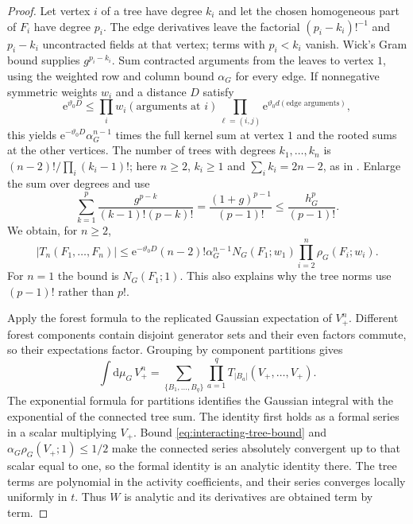 \documentclass[11pt,letterpaper,reqno]{amsart}
\newcommand{\dd}{\mathrm d}
\begin{document}
\begin{proof}
Let vertex $i$ of a tree have degree $k_i$
and let the chosen homogeneous part of $F_i$
have degree $p_i$. The edge derivatives leave
the factorial $(p_i-k_i)!^{-1}$ and $p_i-k_i$
uncontracted fields at that vertex; terms with
$p_i<k_i$ vanish. Wick's Gram bound supplies
$g^{p_i-k_i}$. Sum contracted arguments from
the leaves to vertex $1$, using the weighted
row and column bound $\alpha_G$ for every
edge. If nonnegative symmetric weights $w_i$
and a distance $D$ satisfy
\[
 \mathrm e^{\vartheta_0D}\le
       \prod_iw_i(\text{arguments at }i)
       \prod_{\ell=(i,j)}
          \mathrm e^{\vartheta_0d(\text{edge arguments})},
\]
this yields $\mathrm e^{-\vartheta_0D}\alpha_G^{n-1}$
times the full kernel sum at vertex $1$
and the rooted sums at the other vertices.
The number of trees with degrees $k_1,\ldots,k_n$
is $(n-2)!/\prod_i(k_i-1)!$; here $n\ge2$,
$k_i\ge1$ and $\sum_i k_i=2n-2$, as in
\cite[Proposition~4]{PostnikovLin2019}.
Enlarge the sum over degrees and use
\[
 \sum_{k=1}^{p}
       \frac{g^{p-k}}{(k-1)!(p-k)!}
       =\frac{(1+g)^{p-1}}{(p-1)!}
       \le\frac{h_G^p}{(p-1)!}.
\]
We obtain, for $n\ge2$,
\begin{equation}\label{eq:interacting-tree-bound}
 |T_n(F_1,\ldots,F_n)|
 \le \mathrm e^{-\vartheta_0D}(n-2)!\alpha_G^{n-1}
                N_G(F_1;w_1)\prod_{i=2}^n\rho_G(F_i;w_i).
\end{equation}
For $n=1$ the bound is $N_G(F_1;1)$.
This also explains why the tree norms use
$(p-1)!$ rather than $p!$.

Apply the forest formula to the replicated
Gaussian expectation of $V_+^n$.
Different forest components contain disjoint
generator sets and their even factors commute,
so their expectations factor. Grouping by
component partitions gives
\[
 \int\dd\mu_G\,V_+^n
       =\sum_{\{B_1,\ldots,B_q\}}
                     \prod_{a=1}^qT_{|B_a|}(V_+,\ldots,V_+).
\]
The exponential formula for partitions
identifies the Gaussian integral with the
exponential of the connected tree sum.
The identity first holds as a formal series
in a scalar multiplying $V_+$. Bound
\eqref{eq:interacting-tree-bound} and
$\alpha_G\rho_G(V_+;1)\le1/2$ make the
connected series absolutely convergent up
to that scalar equal to one, so the formal
identity is an analytic identity there.
The tree terms are polynomial in the
activity coefficients, and their series
converges locally uniformly in $t$. Thus $W$
is analytic and its derivatives are obtained
term by term.


\end{proof}
\end{document}
